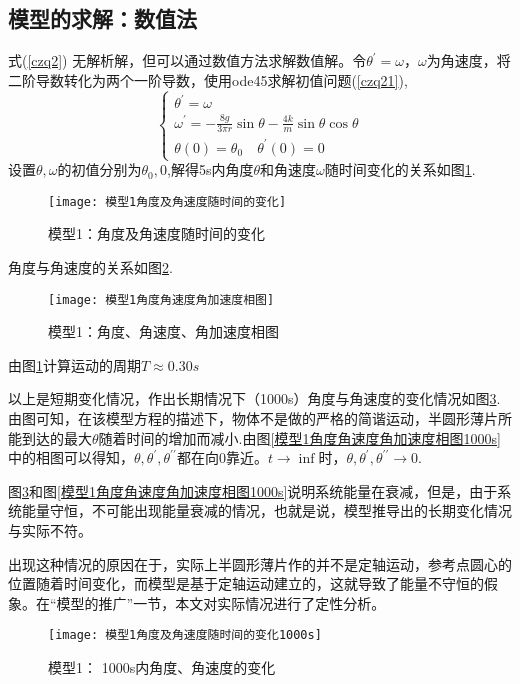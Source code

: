 \documentclass[withoutpreface,bwprint]{cumcmthesis} %
\begin{document}
	\subsection{模型的求解：数值法}
	式(\ref{czq2}) 无解析解，但可以通过数值方法求解数值解。令$\theta^{\prime}=\omega$，$\omega$为角速度，将二阶导数转化为两个一阶导数，使用ode45求解初值问题(\ref{czq21}),
		\begin{equation}\label{czq21}
	\left\{\begin{array}{l}
	\theta^{\prime}=\omega\\
	\omega^{ \prime}=-\frac{8g}{3 \pi r} \sin \theta-\frac{4 k}{m} \sin \theta \cos \theta \\
	\theta(0)=\theta_{0} \quad \theta^{\prime}(0)=0
	\end{array}\right.
	\end{equation}
	设置$\theta,\omega$的初值分别为$\theta_0,0$,解得5s内角度$\theta$和角速度$\omega$随时间变化的关系如图\ref{模型1角度及角速度随时间的变化}.
		 \begin{figure}[H]
		\centering
		\texttt{[image: 模型1角度及角速度随时间的变化]}
		\caption{模型1：角度及角速度随时间的变化}
		\label{模型1角度及角速度随时间的变化}
	\end{figure}
	角度与角速度的关系如图\ref{模型角度角速度角加速度相图}.
			 \begin{figure}[H]
		\centering
		\texttt{[image: 模型1角度角速度角加速度相图]}
		\caption{模型1：角度、角速度、角加速度相图}
		\label{模型角度角速度角加速度相图}
	\end{figure}
   由图\ref{模型1角度及角速度随时间的变化}计算运动的周期$T\approx 0.30s$
   
   以上是短期变化情况，作出长期情况下（1000s）角度与角速度的变化情况如图\ref{模型1角度及角速度随时间的变化1000s}.由图可知，在该模型方程的描述下，物体不是做的严格的简谐运动，半圆形薄片所能到达的最大$\theta$随着时间的增加而减小.由图\ref{模型1角度角速度角加速度相图1000s}中的相图可以得知，$\theta,\theta^{\prime},\theta^{\prime \prime}$都在向0靠近。$t \rightarrow  \inf $时，$\theta,\theta^{\prime},\theta^{\prime \prime} \rightarrow 0 $.
   
   图\ref{模型1角度及角速度随时间的变化1000s}和图\ref{模型1角度角速度角加速度相图1000s}说明系统能量在衰减，但是，由于系统能量守恒，不可能出现能量衰减的情况，也就是说，模型推导出的长期变化情况与实际不符。
   
   出现这种情况的原因在于，实际上半圆形薄片作的并不是定轴运动，参考点圆心的位置随着时间变化，而模型是基于定轴运动建立的，这就导致了能量不守恒的假象。在“模型的推广”一节，本文对实际情况进行了定性分析。
   			 \begin{figure}[H]
   	\centering
   	\texttt{[image: 模型1角度及角速度随时间的变化1000s]}
   	\caption{模型1： 1000s内角度、角速度的变化}
   	\label{模型1角度及角速度随时间的变化1000s}
   \end{figure}
\end{document}
